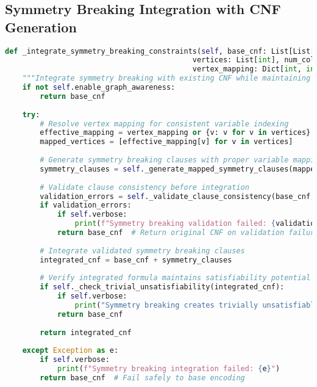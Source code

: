 \subsection{Symmetry Breaking Integration with CNF Generation}
\label{appendix:symmetry-integration}

\begin{lstlisting}[language=Python, caption=Symmetry Breaking Integration with CNF Generation]
def _integrate_symmetry_breaking_constraints(self, base_cnf: List[List[int]], 
                                           vertices: List[int], num_colors: int,
                                           vertex_mapping: Dict[int, int] = None) -> List[List[int]]:
    """Integrate symmetry breaking with existing CNF while maintaining consistency"""
    if not self.enable_graph_awareness:
        return base_cnf
    
    try:
        # Resolve vertex mapping for consistent variable indexing
        effective_mapping = vertex_mapping or {v: v for v in vertices}
        mapped_vertices = [effective_mapping[v] for v in vertices]
        
        # Generate symmetry breaking clauses with proper variable mapping
        symmetry_clauses = self._generate_mapped_symmetry_clauses(mapped_vertices, num_colors)
        
        # Validate clause consistency before integration
        validation_errors = self._validate_clause_consistency(base_cnf, symmetry_clauses)
        if validation_errors:
            if self.verbose:
                print(f"Symmetry breaking validation failed: {validation_errors}")
            return base_cnf  # Return original CNF on validation failure
        
        # Integrate validated symmetry breaking clauses
        integrated_cnf = base_cnf + symmetry_clauses
        
        # Verify integrated formula maintains satisfiability potential
        if self._check_trivial_unsatisfiability(integrated_cnf):
            if self.verbose:
                print("Symmetry breaking creates trivially unsatisfiable formula")
            return base_cnf
        
        return integrated_cnf
        
    except Exception as e:
        if self.verbose:
            print(f"Symmetry breaking integration failed: {e}")
        return base_cnf  # Fail safely to base encoding
\end{lstlisting}

